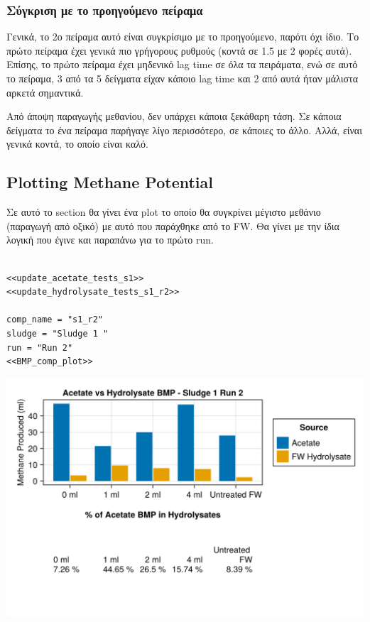 \documentclass[11pt]{article}
\begin{document}
\subsubsection{Σύγκριση με το προηγούμενο πείραμα}
\label{sec:org817de5a}
Γενικά, το 2ο πείραμα αυτό είναι συγκρίσιμο με το προηγούμενο, παρότι όχι ίδιο. Το πρώτο πείραμα έχει γενικά πιο γρήγορους ρυθμούς (κοντά σε 1.5 με 2 φορές αυτά). Επίσης, το πρώτο πείραμα έχει μηδενικό lag time σε όλα τα πειράματα, ενώ σε αυτό το πείραμα, 3 από τα 5 δείγματα είχαν κάποιο lag time και 2 από αυτά ήταν μάλιστα αρκετά σημαντικά.

Από άποψη παραγωγής μεθανίου, δεν υπάρχει κάποια ξεκάθαρη τάση. Σε κάποια δείγματα το ένα πείραμα παρήγαγε λίγο περισσότερο, σε κάποιες το άλλο. Αλλά, είναι γενικά κοντά, το οποίο είναι καλό.

\subsection{Plotting Methane Potential}
\label{sec:org58ff1b0}
Σε αυτό το section θα γίνει ένα plot το οποίο θα συγκρίνει μέγιστο μεθάνιο (παραγωγή από οξικό) με αυτό που παράχθηκε από το FW. Θα γίνει με την ίδια λογική που έγινε και παραπάνω για το πρώτο run.

\begin{verbatim}

<<update_acetate_tests_s1>>
<<update_hydrolysate_tests_s1_r2>>

comp_name = "s1_r2"
sludge = "Sludge 1 "
run = "Run 2"
<<BMP_comp_plot>>
\end{verbatim}

\begin{center}
\includegraphics[width=.9\linewidth]{../plots/BMPs/Hydrolyzed FW/acet_vs_hydro_bmp_s1_r2.png}
\end{center}
\end{document}
